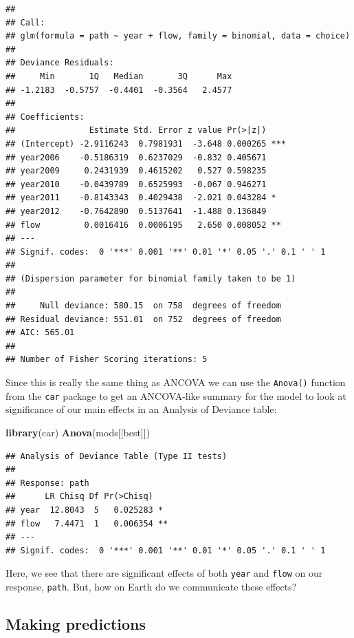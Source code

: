 \documentclass[
]{book}
\newenvironment{Shaded}{\begin{snugshade}}{\end{snugshade}}
\newcommand{\KeywordTok}[1]{\textcolor[rgb]{0.13,0.29,0.53}{\textbf{#1}}}
\newcommand{\NormalTok}[1]{#1}
\begin{document}
\begin{verbatim}
## 
## Call:
## glm(formula = path ~ year + flow, family = binomial, data = choice)
## 
## Deviance Residuals: 
##     Min       1Q   Median       3Q      Max  
## -1.2183  -0.5757  -0.4401  -0.3564   2.4577  
## 
## Coefficients:
##               Estimate Std. Error z value Pr(>|z|)    
## (Intercept) -2.9116243  0.7981931  -3.648 0.000265 ***
## year2006    -0.5186319  0.6237029  -0.832 0.405671    
## year2009     0.2431939  0.4615202   0.527 0.598235    
## year2010    -0.0439789  0.6525993  -0.067 0.946271    
## year2011    -0.8143343  0.4029438  -2.021 0.043284 *  
## year2012    -0.7642890  0.5137641  -1.488 0.136849    
## flow         0.0016416  0.0006195   2.650 0.008052 ** 
## ---
## Signif. codes:  0 '***' 0.001 '**' 0.01 '*' 0.05 '.' 0.1 ' ' 1
## 
## (Dispersion parameter for binomial family taken to be 1)
## 
##     Null deviance: 580.15  on 758  degrees of freedom
## Residual deviance: 551.01  on 752  degrees of freedom
## AIC: 565.01
## 
## Number of Fisher Scoring iterations: 5
\end{verbatim}

Since this is really the same thing as ANCOVA we can use the \texttt{Anova()} function from the \texttt{car} package to get an ANCOVA-like summary for the model to look at significance of our main effects in an Analysis of Deviance table:

\begin{Shaded}
\begin{Highlighting}[]
\KeywordTok{library}\NormalTok{(car)}
\KeywordTok{Anova}\NormalTok{(mods[[best]])}
\end{Highlighting}
\end{Shaded}

\begin{verbatim}
## Analysis of Deviance Table (Type II tests)
## 
## Response: path
##      LR Chisq Df Pr(>Chisq)   
## year  12.8043  5   0.025283 * 
## flow   7.4471  1   0.006354 **
## ---
## Signif. codes:  0 '***' 0.001 '**' 0.01 '*' 0.05 '.' 0.1 ' ' 1
\end{verbatim}

Here, we see that there are significant effects of both \texttt{year} and \texttt{flow} on our response, \texttt{path}. But, how on Earth do we communicate these effects?

\hypertarget{making-predictions}{%
\subsection{Making predictions}\label{making-predictions}}
\end{document}
